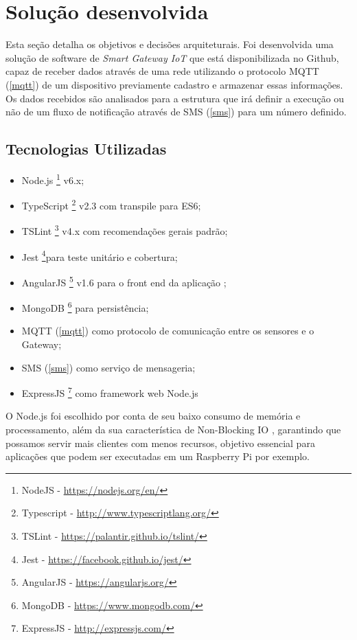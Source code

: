 \section{Solução desenvolvida}
\label{sec:iotGateway}

Esta seção detalha os objetivos e decisões arquiteturais. Foi desenvolvida uma solução de software de \textit{Smart Gateway IoT} que está disponibilizada no Github, capaz de receber dados através de uma rede utilizando o protocolo MQTT	(\ref{mqtt}) de um dispositivo previamente cadastro e armazenar essas informações. Os dados recebidos são analisados para a estrutura que irá definir a execução ou não de um fluxo de notificação através de SMS (\ref{sms}) para um número definido.

\subsection{Tecnologias Utilizadas} 
\begin{itemize}
	\item Node.js \footnote{NodeJS - \url{https://nodejs.org/en/}} v6.x;
	\item TypeScript \footnote{Typescript - \url{http://www.typescriptlang.org/}} v2.3 com transpile para ES6;
	\item TSLint \footnote{TSLint - \url{https://palantir.github.io/tslint/}} v4.x com recomendações gerais padrão;
	\item Jest \footnote{Jest - \url{https://facebook.github.io/jest/}}para teste unitário e cobertura;
	\item AngularJS \footnote{AngularJS - \url{https://angularjs.org/}} v1.6 para o front end da aplicação ;
	\item MongoDB \footnote{MongoDB - \url{https://www.mongodb.com/}} para persistência;
	\item MQTT (\ref{mqtt}) como protocolo de comunicação entre os sensores e o Gateway;
	\item SMS (\ref{sms}) como serviço de mensageria;
	\item ExpressJS \footnote{ExpressJS - \url{http://expressjs.com/}} como framework web Node.js 
\end{itemize}

O Node.js foi escolhido por conta de seu baixo consumo de memória e processamento, além da sua característica de Non-Blocking IO \cite{NodeJSNonBlockingIO}, garantindo que possamos servir mais clientes com menos recursos, objetivo essencial para aplicações que podem ser executadas em um Raspberry Pi por exemplo.

